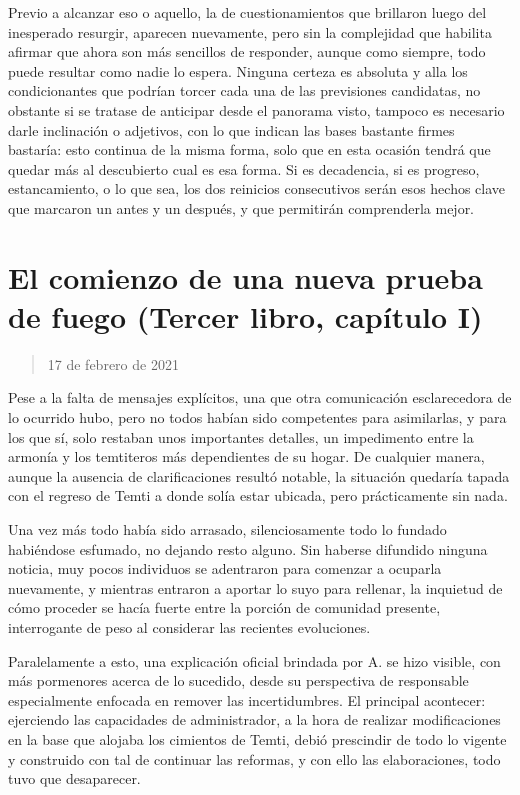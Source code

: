 \documentclass[
]{book}
\begin{document}
Previo a alcanzar eso o aquello, la de cuestionamientos que brillaron luego del inesperado resurgir, aparecen nuevamente, pero sin la complejidad que habilita afirmar que ahora son más sencillos de responder, aunque como siempre, todo puede resultar como nadie lo espera. Ninguna certeza es absoluta y alla los condicionantes que podrían torcer cada una de las previsiones candidatas, no obstante si se tratase de anticipar desde el panorama visto, tampoco es necesario darle inclinación o adjetivos, con lo que indican las bases bastante firmes bastaría: esto continua de la misma forma, solo que en esta ocasión tendrá que quedar más al descubierto cual es esa forma. Si es decadencia, si es progreso, estancamiento, o lo que sea, los dos reinicios consecutivos serán esos hechos clave que marcaron un antes y un después, y que permitirán comprenderla mejor.

\hypertarget{el-comienzo-de-una-nueva-prueba-de-fuego-tercer-libro-capuxedtulo-i}{%
\section{El comienzo de una nueva prueba de fuego (Tercer libro, capítulo I)}\label{el-comienzo-de-una-nueva-prueba-de-fuego-tercer-libro-capuxedtulo-i}}

\begin{quote}
17 de febrero de 2021
\end{quote}

Pese a la falta de mensajes explícitos, una que otra comunicación esclarecedora de lo ocurrido hubo, pero no todos habían sido competentes para asimilarlas, y para los que sí, solo restaban unos importantes detalles, un impedimento entre la armonía y los temtiteros más dependientes de su hogar. De cualquier manera, aunque la ausencia de clarificaciones resultó notable, la situación quedaría tapada con el regreso de Temti a donde solía estar ubicada, pero prácticamente sin nada.

Una vez más todo había sido arrasado, silenciosamente todo lo fundado habiéndose esfumado, no dejando resto alguno. Sin haberse difundido ninguna noticia, muy pocos individuos se adentraron para comenzar a ocuparla nuevamente, y mientras entraron a aportar lo suyo para rellenar, la inquietud de cómo proceder se hacía fuerte entre la porción de comunidad presente, interrogante de peso al considerar las recientes evoluciones.

Paralelamente a esto, una explicación oficial brindada por A. se hizo visible, con más pormenores acerca de lo sucedido, desde su perspectiva de responsable especialmente enfocada en remover las incertidumbres. El principal acontecer: ejerciendo las capacidades de administrador, a la hora de realizar modificaciones en la base que alojaba los cimientos de Temti, debió prescindir de todo lo vigente y construido con tal de continuar las reformas, y con ello las elaboraciones, todo tuvo que desaparecer.
\end{document}
